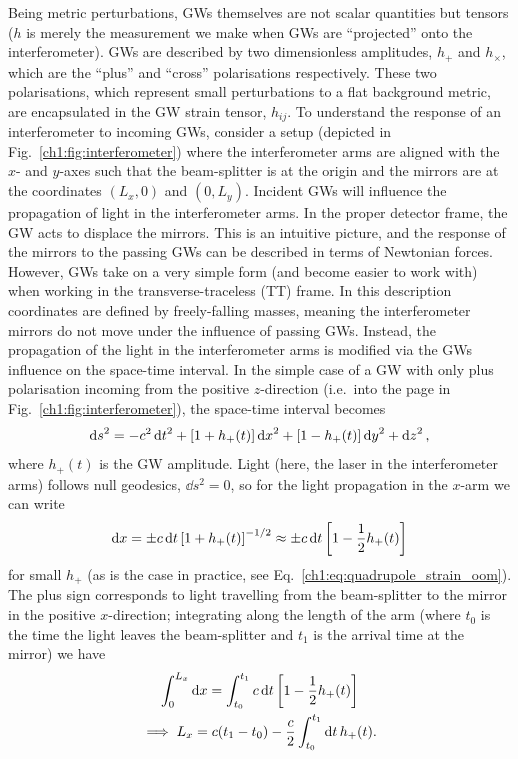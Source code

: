 Being metric perturbations, GWs themselves are not scalar quantities but tensors ($h$ is merely the measurement we make when GWs are ``projected'' onto the interferometer).
GWs are described by two dimensionless amplitudes, $h_+$ and $h_\times$, which are the ``plus'' and ``cross'' polarisations respectively.
These two polarisations, which represent small perturbations to a flat background metric, are encapsulated in the GW strain tensor, $h_{ij}$.
To understand the response of an interferometer to incoming GWs, consider a setup (depicted in Fig.~\ref{ch1:fig:interferometer}) where the interferometer arms are aligned with the $x$- and $y$-axes such that the beam-splitter is at the origin and the mirrors are at the coordinates $(L_x,0)$ and $(0,L_y)$.
Incident GWs will influence the propagation of light in the interferometer arms. 
In the proper detector frame, the GW acts to displace the mirrors. 
This is an intuitive picture, and the response of the mirrors to the passing GWs can be described in terms of Newtonian forces. 
However, GWs take on a very simple form (and become easier to work with) when working in the transverse-traceless (TT) frame.
In this description coordinates are defined by freely-falling masses, meaning the interferometer mirrors do not move under the influence of passing GWs. 
Instead, the propagation of the light in the interferometer arms is modified via the GWs influence on the space-time interval.
In the simple case of a GW with only plus polarisation incoming from the positive $z$-direction (i.e.\, into the page in Fig.~\ref{ch1:fig:interferometer}), the space-time interval becomes
\begin{equation}
    \dd{s}^2 = -c^2 \dd{t}^2 + \qty[1 + h_+(t)] \dd{x}^2 + \qty[1 - h_+(t)] \dd{y}^2 + \dd{z}^2,
\end{equation}
where $h_+(t)$ is the GW amplitude.
Light (here, the laser in the interferometer arms) follows null geodesics, $\dd{s}^2 = 0$, so for the light propagation in the $x$-arm we can write
\begin{equation}
    \dd{x} = \pm c\dd{t} \qty[1 + h_+(t)]^{-1/2} \approx \pm c\dd{t} \qty[1 - \frac{1}{2} h_+(t)]
\end{equation}
for small $h_+$ (as is the case in practice, see Eq.~\ref{ch1:eq:quadrupole_strain_oom}).
The plus sign corresponds to light travelling from the beam-splitter to the mirror in the positive $x$-direction; integrating along the length of the arm (where $t_0$ is the time the light leaves the beam-splitter and $t_1$ is the arrival time at the mirror) we have
\begin{gather}
    \int_0^{L_x} \dd{x} = \int_{t_0}^{t_1} c\dd{t} \qty[1 - \frac{1}{2} h_+(t)] \\
    \implies L_x = c(t_1 - t_0) - \frac{c}{2} \int_{t_0}^{t_1} \dd{t} h_+(t). \label{ch1:eq:lx_outward}
\end{gather}
